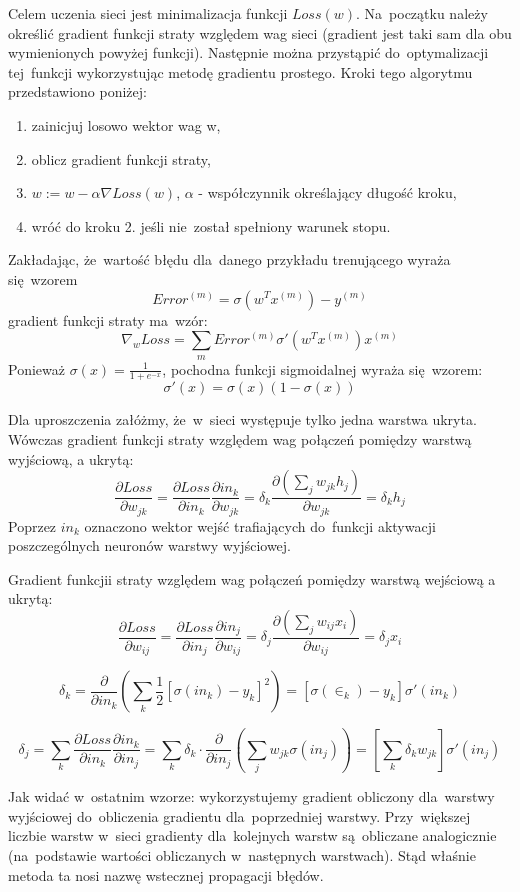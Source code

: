 Celem uczenia sieci jest minimalizacja funkcji $Loss(w)$. Na~początku należy określić gradient funkcji straty
względem wag sieci (gradient jest taki sam dla obu wymienionych powyżej funkcji).
Następnie można przystąpić do~optymalizacji tej~funkcji wykorzystując metodę gradientu prostego.
Kroki tego algorytmu przedstawiono poniżej:
\begin{enumerate}
  \item zainicjuj losowo wektor wag w,
  \item oblicz gradient funkcji straty,
  \item $w:=w-\alpha \nabla Loss(w)$, $\alpha$ - współczynnik określający długość kroku,
  \item wróć do kroku 2. jeśli nie~został spełniony warunek stopu.
\end{enumerate}

Zakładając, że~wartość błędu dla~danego przykładu trenującego wyraża się~wzorem
$$Error^{(m)}=\sigma(w^{T}x^{(m)})-y^{(m)}$$
gradient funkcji straty ma~wzór:
$$\nabla_{w}Loss=\sum\limits_{m}Error^{(m)}\sigma'(w^{T}x^{(m)})x^{(m)}$$
Ponieważ $\sigma(x)=\frac{1}{1+e^{-x}}$, pochodna funkcji sigmoidalnej wyraża się~wzorem:
$$\sigma'(x)=\sigma(x)(1-\sigma(x))$$

Dla uproszczenia załóżmy, że~w~sieci występuje tylko jedna warstwa ukryta. Wówczas gradient funkcji straty
względem wag połączeń pomiędzy warstwą wyjściową, a ukrytą:
$$\frac{\partial Loss}{\partial w_{jk}}=\frac{\partial Loss}{\partial in_k}\frac{\partial
in_k}{\partial w_{jk}}= \delta_k \frac{\partial (\sum\limits_j w_{jk}h_j)}{\partial w_{jk}} = \delta_k h_j$$
Poprzez $in_k$ oznaczono wektor wejść trafiających do~funkcji aktywacji poszczególnych neuronów warstwy
wyjściowej.

Gradient funkcjii straty względem wag połączeń pomiędzy warstwą wejściową a ukrytą: 
$$ \frac{\partial Loss}{\partial w_{ij}}=\frac{\partial Loss}{\partial in_j}\frac{\partial in_j}{\partial
w_{ij}} = \delta_j \frac{\partial (\sum\limits_j w_{ij}x_i)}{\partial w_{ij}} = \delta_j x_i $$

$$ \delta_k = \frac{\partial}{\partial in_k}(\sum\limits_k \frac{1}{2}
[\sigma(in_k)-y_k]^2)=[\sigma(\in_k)-y_k]\sigma'(in_k)$$

$$ \delta_j = \sum\limits_k\frac{\partial Loss}{\partial in_k}\frac{\partial in_k}{\partial
in_j}=\sum\limits_k \delta_k \cdot \frac{\partial}{\partial in_j}(\sum\limits_j w_{jk}\sigma(in_j))=[\sum\limits_k \delta_k
w_{jk}]\sigma'(in_j)$$

Jak widać w~ostatnim wzorze: wykorzystujemy gradient obliczony dla~warstwy wyjściowej
do~obliczenia gradientu dla~poprzedniej warstwy. Przy~większej liczbie warstw w~sieci gradienty
dla~kolejnych warstw są~obliczane analogicznie (na~podstawie wartości obliczanych w~następnych warstwach).
Stąd właśnie metoda ta nosi nazwę wstecznej propagacji błędów.


